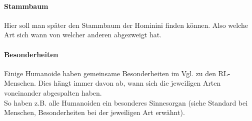 \paragraph{Stammbaum} Hier soll man später den Stammbaum der Hominini finden können. Also welche Art sich wann von welcher anderen abgezweigt hat.

\paragraph{Besonderheiten}
Einige Humanoide haben gemeinsame Besonderheiten im Vgl. zu den RL-Menschen. Dies hängt immer davon ab, wann sich die jeweiligen Arten voneinander abgespalten haben. \\
So haben z.B. alle Humanoiden ein besonderes Sinnesorgan (siehe Standard bei Menschen, Besonderheiten bei der jeweiligen Art erwähnt).


